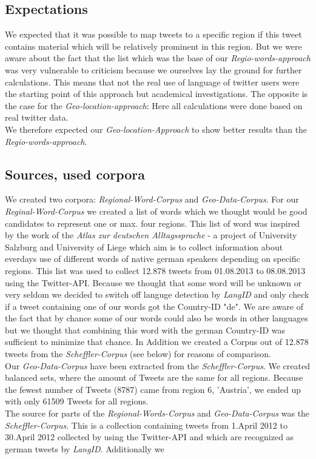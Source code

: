 \documentclass[../Main.tex]{subfiles}
\begin{document}
\subsection{Expectations}
We expected that it was possible to map tweets to a specific region if this tweet contains material which will be relatively prominent in this region. But we were aware about the fact that the list which was the base of our \emph{Regio-words-approach} was very vulnerable to criticism because we ourselves lay the ground for further calculations. This means that not the real use of language of twitter users were the starting point of this approach but academical investigations. The opposite is the case for the \emph{Geo-location-approach}: Here all calculations were done based on real twitter data.\\
We therefore expected our \emph{Geo-location-Approach} to show better results than the \emph{Regio-words-approach}.
\subsection{Sources, used corpora}
We created two corpora: \emph{Regional-Word-Corpus} and \emph{Geo-Data-Corpus}.
For our \emph{Reginal-Word-Corpus} we created a list of words which we thought would be good candidates to represent one or max. four regions. This list of word was inspired by the work of the \emph{Atlas zur deutschen Alltagssprache} - a project of University Salzburg and University of Liege which aim is to collect information about everdays use of different words of native german speakers depending on specific regions. This list was used to collect 12.878 tweets from 01.08.2013 to 08.08.2013 using the Twitter-API. Because we thought that some word will be unknown or very seldom we decided to switch off languge detection by \emph{LangID} and only check if a tweet containing one of our words got the Country-ID "de". We are aware of the fact that by chance some of our words could also be words in other languages but we thought that combining this word with the german Country-ID was sufficient to minimize that chance. In Addition we created a Corpus out of 12.878 tweets from the \emph{Scheffler-Corpus} (see below) for reasons of comparison.\\
Our \emph{Geo-Data-Corpus} have been extracted from the \emph{Scheffler-Corpus}.
We created balanced sets, where the amount of  Tweets are the same for all regions. Because the fewest number of Tweets (8787) came from region 6, 'Austria', we ended up with only 61509 Tweets for all regions.\\
The source for parts of the \emph{Regional-Words-Corpus} and \emph{Geo-Data-Corpus} was the \emph{Scheffler-Corpus}. This is a collection containing  tweets from 1.April 2012 to 30.April 2012 collected by using the Twitter-API and which are recognized as german tweets by \emph{LangID}.
Additionally we 
\end{document}
